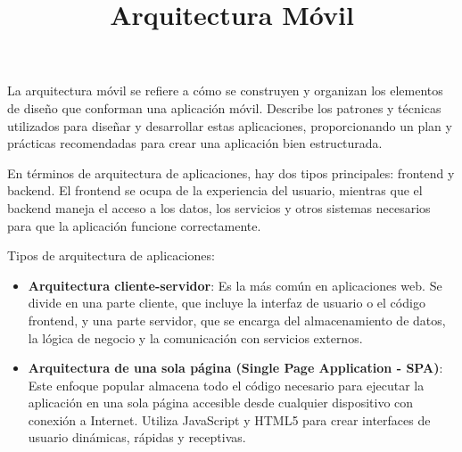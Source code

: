 \documentclass{article}
\title{Arquitectura Móvil}
\author{}
\date{}
\begin{document}
\maketitle

La arquitectura móvil se refiere a cómo se construyen y organizan los elementos de diseño que conforman una aplicación móvil. Describe los patrones y técnicas utilizados para diseñar y desarrollar estas aplicaciones, proporcionando un plan y prácticas recomendadas para crear una aplicación bien estructurada.

En términos de arquitectura de aplicaciones, hay dos tipos principales: frontend y backend. El frontend se ocupa de la experiencia del usuario, mientras que el backend maneja el acceso a los datos, los servicios y otros sistemas necesarios para que la aplicación funcione correctamente.

Tipos de arquitectura de aplicaciones:

\begin{itemize}
    \item \textbf{Arquitectura cliente-servidor}: Es la más común en aplicaciones web. Se divide en una parte cliente, que incluye la interfaz de usuario o el código frontend, y una parte servidor, que se encarga del almacenamiento de datos, la lógica de negocio y la comunicación con servicios externos.
    
    \item \textbf{Arquitectura de una sola página (Single Page Application - SPA)}: Este enfoque popular almacena todo el código necesario para ejecutar la aplicación en una sola página accesible desde cualquier dispositivo con conexión a Internet. Utiliza JavaScript y HTML5 para crear interfaces de usuario dinámicas, rápidas y receptivas.
\end{itemize}
\end{document}
